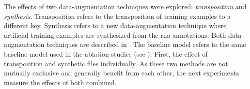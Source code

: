 
The effects of two data-augmentation techniques were
explored: \emph{transposition} and \emph{synthesis}.
Transposition refers to the transposition of training
examples to a different key. Synthesis refers to a new
data-augmentation technique where artificial training
examples are synthesized from the \gls{rna} annotations.
Both data-augmentation techniques are described in
. The baseline model refers to the
same baseline model used in the ablation studies (see
). First, the effect of
transposition and synthetic files individually. As these two
methods are not mutually exclusive and generally benefit
from each other, the next experiments measure the effects of
both combined. 
